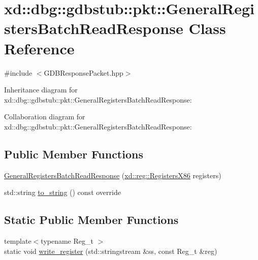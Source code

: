 \hypertarget{classxd_1_1dbg_1_1gdbstub_1_1pkt_1_1_general_registers_batch_read_response}{}\section{xd\+:\+:dbg\+:\+:gdbstub\+:\+:pkt\+:\+:General\+Registers\+Batch\+Read\+Response Class Reference}
\label{classxd_1_1dbg_1_1gdbstub_1_1pkt_1_1_general_registers_batch_read_response}


{\ttfamily \#include $<$G\+D\+B\+Response\+Packet.\+hpp$>$}



Inheritance diagram for xd\+:\+:dbg\+:\+:gdbstub\+:\+:pkt\+:\+:General\+Registers\+Batch\+Read\+Response\+:


Collaboration diagram for xd\+:\+:dbg\+:\+:gdbstub\+:\+:pkt\+:\+:General\+Registers\+Batch\+Read\+Response\+:
\subsection*{Public Member Functions}
\begin{DoxyCompactItemize}
\item 
\mbox{\hyperlink{classxd_1_1dbg_1_1gdbstub_1_1pkt_1_1_general_registers_batch_read_response_a5fffeb0c1a1d1fa8ca99abe59619b4c8}{General\+Registers\+Batch\+Read\+Response}} (\mbox{\hyperlink{namespacexd_1_1reg_a0c10a4d10e689bc16f6f1a8feb4fb9b8}{xd\+::reg\+::\+Registers\+X86}} registers)
\item 
std\+::string \mbox{\hyperlink{classxd_1_1dbg_1_1gdbstub_1_1pkt_1_1_general_registers_batch_read_response_ad44f1a50fe2b12296f8938d3318e1836}{to\+\_\+string}} () const override
\end{DoxyCompactItemize}
\subsection*{Static Public Member Functions}
\begin{DoxyCompactItemize}
\item 
{\footnotesize template$<$typename Reg\+\_\+t $>$ }\\static void \mbox{\hyperlink{classxd_1_1dbg_1_1gdbstub_1_1pkt_1_1_general_registers_batch_read_response_a0c05faaa9a29a87d73c318f811739c88}{write\+\_\+register}} (std\+::stringstream \&ss, const Reg\+\_\+t \&reg)
\end{DoxyCompactItemize}


